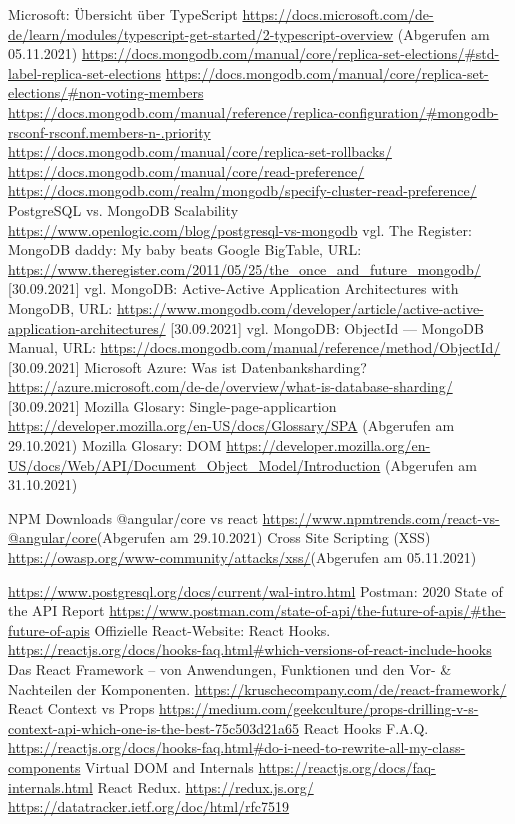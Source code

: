 \begin{thebibliography}{HR08}
Microsoft: Übersicht über TypeScript \url{https://docs.microsoft.com/de-de/learn/modules/typescript-get-started/2-typescript-overview} (Abgerufen am 05.11.2021)
 \url{https://docs.mongodb.com/manual/core/replica-set-elections/#std-label-replica-set-elections}
 \url{https://docs.mongodb.com/manual/core/replica-set-elections/#non-voting-members}
 \url{https://docs.mongodb.com/manual/reference/replica-configuration/#mongodb-rsconf-rsconf.members-n-.priority}
 \url{https://docs.mongodb.com/manual/core/replica-set-rollbacks/}
 \url{https://docs.mongodb.com/manual/core/read-preference/}
 \url{https://docs.mongodb.com/realm/mongodb/specify-cluster-read-preference/}
 PostgreSQL vs. MongoDB Scalability \url{https://www.openlogic.com/blog/postgresql-vs-mongodb}
 vgl. The Register: MongoDB daddy: My baby beats Google BigTable, URL: \url{https://www.theregister.com/2011/05/25/the_once_and_future_mongodb/} [30.09.2021]
 vgl. MongoDB: Active-Active Application Architectures with MongoDB, URL: \url{https://www.mongodb.com/developer/article/active-active-application-architectures/} [30.09.2021]
 vgl. MongoDB: ObjectId — MongoDB Manual, URL: \url{https://docs.mongodb.com/manual/reference/method/ObjectId/} [30.09.2021]
 Microsoft Azure: Was ist Datenbanksharding? \url{https://azure.microsoft.com/de-de/overview/what-is-database-sharding/} [30.09.2021]
 Mozilla Glosary: Single-page-applicartion \url{https://developer.mozilla.org/en-US/docs/Glossary/SPA} (Abgerufen am 29.10.2021)
 Mozilla Glosary: DOM \url{https://developer.mozilla.org/en-US/docs/Web/API/Document_Object_Model/Introduction} (Abgerufen am 31.10.2021)

 NPM Downloads @angular/core vs react \url{https://www.npmtrends.com/react-vs-@angular/core}(Abgerufen am 29.10.2021)
 Cross Site Scripting (XSS) \url{https://owasp.org/www-community/attacks/xss/}(Abgerufen am 05.11.2021)

 \url{https://www.postgresql.org/docs/current/wal-intro.html}
Postman: 2020 State of the API Report \url{https://www.postman.com/state-of-api/the-future-of-apis/#the-future-of-apis}
 Offizielle React-Website: React Hooks. \url{https://reactjs.org/docs/hooks-faq.html#which-versions-of-react-include-hooks}
 Das React Framework – von Anwendungen, Funktionen und den Vor- \& Nachteilen der Komponenten. \url{https://kruschecompany.com/de/react-framework/}
 React Context vs Props \url{https://medium.com/geekculture/props-drilling-v-s-context-api-which-one-is-the-best-75c503d21a65}
 React Hooks F.A.Q. \url{https://reactjs.org/docs/hooks-faq.html#do-i-need-to-rewrite-all-my-class-components}
 Virtual DOM and Internals \url{https://reactjs.org/docs/faq-internals.html}
 React Redux. \url{https://redux.js.org/}
 \url{https://datatracker.ietf.org/doc/html/rfc7519}



\end{thebibliography}
